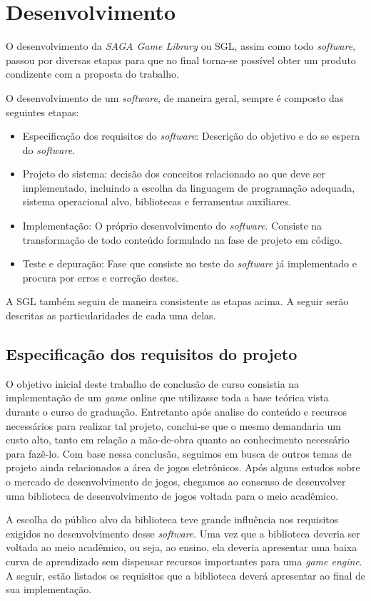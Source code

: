 \chapter{Desenvolvimento}
\label{cap:desenvolvimento}
%
%
O desenvolvimento da \textit{SAGA Game Library} ou SGL, assim como todo \textit{software}, passou por diversas etapas para que no final torna-se possível obter um produto condizente com a proposta do trabalho.
\par 
O desenvolvimento de um \textit{software}, de maneira geral, sempre é composto das seguintes etapas:
%
\begin{itemize}
 \item Especificação dos requisitos do \textit{software}: Descrição do objetivo e do se espera do \textit{software}.
 \item Projeto do sistema: decisão dos conceitos relacionado ao que deve ser implementado, incluindo a escolha da linguagem de programação
 adequada, sistema operacional alvo, bibliotecas e ferramentas auxiliares.
 \item Implementação: O próprio desenvolvimento do \textit{software}. Consiste na transformação de todo conteúdo formulado na fase de projeto em código.
 \item Teste e depuração: Fase que consiste no teste do \textit{software} já implementado e procura por erros e correção destes.
\end{itemize}
%
\par 
A SGL também seguiu de maneira consistente as etapas acima. A seguir serão descritas as particularidades de cada uma delas.
%
%
%
%
\section{Especificação dos requisitos do projeto}
%
O objetivo inicial deste trabalho de conclusão de curso consistia na implementação de um \textit{game} online que utilizasse toda a base teórica vista durante o curso de graduação. Entretanto após analise do conteúdo e recursos necessários para realizar tal projeto, conclui-se que o mesmo demandaria um custo alto, tanto em relação a mão-de-obra quanto ao conhecimento necessário para fazê-lo. Com base nessa conclusão, seguimos em busca de outros temas de projeto ainda relacionados a área de jogos eletrônicos. Após alguns estudos sobre o mercado de desenvolvimento de jogos, chegamos ao consenso de desenvolver uma biblioteca de desenvolvimento de jogos voltada para o meio acadêmico.
\par 
A escolha do público alvo da biblioteca teve grande influência nos requisitos exigidos no desenvolvimento desse \textit{software}. Uma vez que
a biblioteca deveria ser voltada ao meio acadêmico, ou seja, ao ensino, ela deveria apresentar uma baixa curva de aprendizado sem dispensar recursos importantes para uma \textit{game engine}. A seguir, estão listados os requisitos que a biblioteca deverá apresentar ao final de sua implementação.
%
